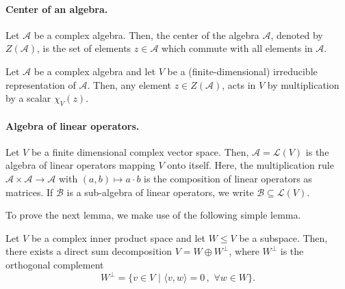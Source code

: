 \paragraph{Center of an algebra.}

\begin{definition}
Let $\mathcal{A}$ be a complex algebra. 
Then, the center of the algebra $\mathcal{A}$, denoted by $Z(\mathcal{A})$, is the set of elements $z \in \mathcal{A}$ which commute with all elements in $\mathcal{A}$.   
\end{definition}

\begin{lemma}
Let $\mathcal{A}$ be a complex algebra and let $V$ be a (finite-dimensional) irreducible representation of $\mathcal{A}$. Then, any element $z \in Z(\mathcal{A})$, acts in $V$ by multiplication by a scalar $\chi_V(z)$.
\end{lemma}

\paragraph{Algebra of linear operators.}

\begin{definition}
Let $V$ be a finite dimensional complex vector space. Then, $\mathcal{A} = \mathcal{L}(V)$ is the algebra of linear operators mapping $V$ onto itself. Here, the multiplication rule
$\mathcal{A} \times \mathcal{A} \rightarrow \mathcal{A}$ with $(a,b) \mapsto a \cdot b$
is the composition of linear operators as matrices. If $\mathcal{B}$ is a sub-algebra of linear operators, we write $\mathcal{B} \subseteq \mathcal{L}(V)$. 
\end{definition}

To prove the next lemma, we make use of the following simple lemma.

\begin{lemma}\label{lem:direct-sum-orth}
Let $V$ be a complex inner product space and let $W \leq V$ be a subspace. Then, there exists a direct sum decomposition $V = W \oplus W^\perp$, where $W^\perp$ is the orthogonal complement
$$
W^\perp = \{ v \in V \,\, | \,\, \langle v,w\rangle = 0\,, \,\, \forall w \in W\}. 
$$
\end{lemma}


